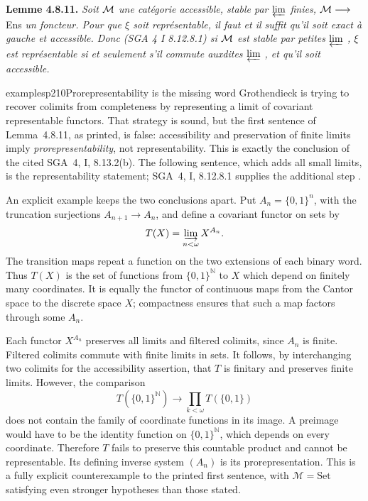 \textbf{Lemme 4.8.11.} \textit{Soit $\mathcal{M}$ une catégorie accessible, stable par $\varprojlim$ finies, $\mathcal{M} \longrightarrow$} Ens \textit{un foncteur. Pour que $\xi$ soit représentable, il faut et il suffit qu'il soit exact à gauche et accessible. Donc (SGA 4 I 8.12.8.1) si $\mathcal{M}$ est stable par petites $\varprojlim$ , $\xi$ est représentable si et seulement s'il commute auxdites $\varprojlim$ , et qu'il soit accessible.}




\begin{dcomment}{examples}{p210}{Prorepresentability is the missing word}
Grothendieck is trying to recover colimits from completeness by representing a limit of covariant representable functors. That strategy is sound, but the first sentence of Lemma~4.8.11, as printed, is false: accessibility and preservation of finite limits imply \emph{prorepresentability}, not representability. This is exactly the conclusion of the cited SGA~4, I, 8.13.2(b). The following sentence, which adds all small limits, is the representability statement; SGA~4, I, 8.12.8.1 supplies the additional step \citep{SGA4I1972}.

An explicit example keeps the two conclusions apart. Put $A_n=\{0,1\}^n$, with the truncation surjections $A_{n+1}\to A_n$, and define a covariant functor on sets by
\[
 T(X)=\varinjlim_{n<\omega} X^{A_n}.
\]
The transition maps repeat a function on the two extensions of each binary word. Thus $T(X)$ is the set of functions from $\{0,1\}^{\mathbb N}$ to $X$ which depend on finitely many coordinates. It is equally the functor of continuous maps from the Cantor space to the discrete space $X$; compactness ensures that such a map factors through some $A_n$.

Each functor $X^{A_n}$ preserves all limits and filtered colimits, since $A_n$ is finite. Filtered colimits commute with finite limits in sets. It follows, by interchanging two colimits for the accessibility assertion, that $T$ is finitary and preserves finite limits. However, the comparison
\[
 T(\{0,1\}^{\mathbb N})\longrightarrow
 \prod_{k<\omega}T(\{0,1\})
\]
does not contain the family of coordinate functions in its image. A preimage would have to be the identity function on $\{0,1\}^{\mathbb N}$, which depends on every coordinate. Therefore $T$ fails to preserve this countable product and cannot be representable. Its defining inverse system $(A_n)$ is its prorepresentation. This is a fully explicit counterexample to the printed first sentence, with $\mathcal M=\mathrm{Set}$ satisfying even stronger hypotheses than those stated.


\end{dcomment}
